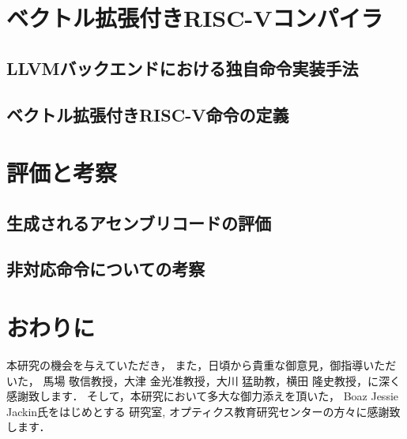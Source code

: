 \documentclass[a4paper,11pt,fleqn]{jbook}
\begin{document}
\newpage
\chapter{ベクトル拡張付きRISC-Vコンパイラ}
\label{chp:4}

\section{LLVMバックエンドにおける独自命令実装手法}
\label{chp:4_1}

\section{ベクトル拡張付きRISC-V命令の定義}
\label{chp:4_2}


\newpage
\chapter{評価と考察}
\label{chp:5}

\section{生成されるアセンブリコードの評価}
\label{chp:5_1}

\section{非対応命令についての考察}
\label{chp:5_2}


\newpage
\chapter{おわりに}
\label{chp:outro}


\newpage
\acknowledgement
本研究の機会を与えていただき，
また，日頃から貴重な御意見，御指導いただいた，
馬場 敬信教授，大津 金光准教授，大川 猛助教，横田 隆史教授，に深く感謝致します．
そして，本研究において多大な御力添えを頂いた，
Boaz Jessie Jackin氏をはじめとする
研究室, オプティクス教育研究センターの方々に感謝致します．


\endacknowledgement

\newpage
{}

\endthebibliography
\end{document}
